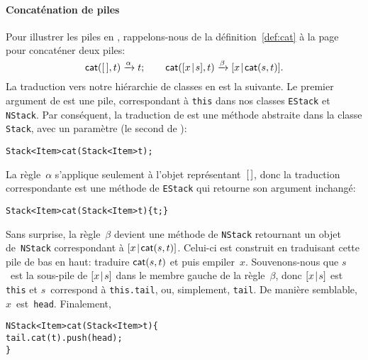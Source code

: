 \paragraph{Concaténation de piles}

Pour illustrer les piles en \Java, rappelons-nous de la définition~\eqref{def:cat} à la
page~\pageref{def:cat} pour concaténer deux
piles:
\begin{equation*}
\textsf{cat}(        [\,],t) \xrightarrow{\smash{\alpha}} t;\qquad
\textsf{cat}([{x}\!\mid\!{s}],t) \xrightarrow{\smash{\beta}}
                                          [{x}\!\mid\!{\textsf{cat}(s,t)}].
\end{equation*}
La traduction vers notre hiérarchie de classes en \Java est la
suivante. Le premier argument de  est une pile,
correspondant à \texttt{this} dans nos classes \texttt{EStack} et
\texttt{NStack}. Par conséquent, la traduction de  est une
méthode abstraite dans la classe \texttt{Stack}, avec un paramètre (le
second de ):
\begin{alltt}
\public \abstractX Stack<Item> cat(\final Stack<Item> t);
\end{alltt}
La règle~\(\alpha\) s'applique seulement à l'objet
représentant~\([\,]\), donc la traduction correspondante est une
méthode de \texttt{EStack} qui retourne son argument inchangé:
\begin{alltt}
\public Stack<Item> cat(\final Stack<Item> t) \{ \return t; \}
\end{alltt}
Sans surprise, la règle~\(\beta\) devient une méthode de
\texttt{NStack} retournant un objet de~\texttt{NStack} correspondant à
\([{x}\!\mid\!{\textsf{cat}(s,t)}]\). Celui-ci est construit en traduisant
cette pile de bas en haut: traduire
\(\textsf{cat}(s,t)\) et puis
empiler~\(x\). Souvenons-nous que \(s\)~est la sous-pile de
\([{x}\!\mid\!{s}]\) dans le membre gauche de la règle~\(\beta\), donc
\([{x}\!\mid\!{s}]\) est \texttt{this} et \(s\)~correspond à
\texttt{this.tail}, ou, simplement, \texttt{tail}. De manière
semblable, \(x\)~est~\texttt{head}. Finalement,
\begin{alltt}
\public NStack<Item> cat(\final Stack<Item> t) \{
  \return tail.cat(t).push(head);
\}
\end{alltt}
